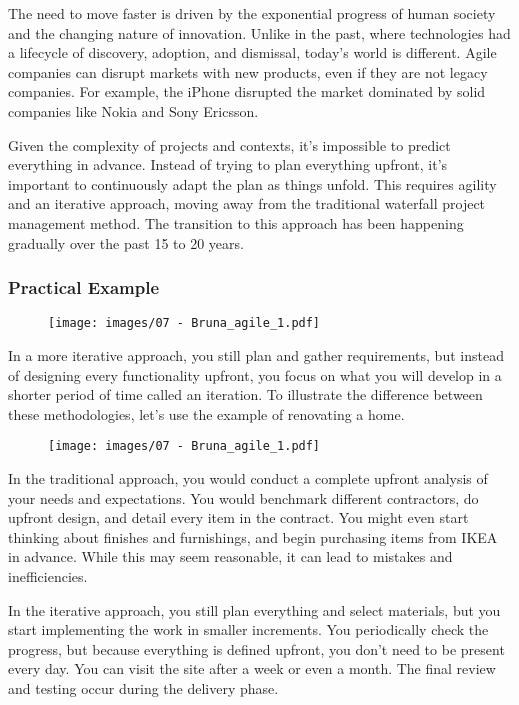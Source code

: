 The need to move faster is driven by the exponential progress of human
society and the changing nature of innovation. Unlike in the past, where
technologies had a lifecycle of discovery, adoption, and dismissal,
today's world is different. Agile companies can disrupt markets with new
products, even if they are not legacy companies. For example, the iPhone
disrupted the market dominated by solid companies like Nokia and Sony
Ericsson.

Given the complexity of projects and contexts, it's impossible to
predict everything in advance. Instead of trying to plan everything
upfront, it's important to continuously adapt the plan as things unfold.
This requires agility and an iterative approach, moving away from the
traditional waterfall project management method. The transition to this
approach has been happening gradually over the past 15 to 20 years.

\subsubsection{Practical Example}

\begin{figure}[!h]
    \centering
    \texttt{[image: images/07 - Bruna\_agile\_1.pdf]}
\end{figure}

In a more iterative approach, you still plan and gather requirements,
but instead of designing every functionality upfront, you focus on what
you will develop in a shorter period of time called an iteration. To
illustrate the difference between these methodologies, let's use the
example of renovating a home.

\begin{figure}[!h]
    \centering
    \texttt{[image: images/07 - Bruna\_agile\_1.pdf]}
\end{figure}

In the traditional approach, you would conduct a complete upfront
analysis of your needs and expectations. You would benchmark different
contractors, do upfront design, and detail every item in the contract.
You might even start thinking about finishes and furnishings, and begin
purchasing items from IKEA in advance. While this may seem reasonable,
it can lead to mistakes and inefficiencies.

In the iterative approach, you still plan everything and select
materials, but you start implementing the work in smaller increments.
You periodically check the progress, but because everything is defined
upfront, you don't need to be present every day. You can visit the site
after a week or even a month. The final review and testing occur during
the delivery phase.

